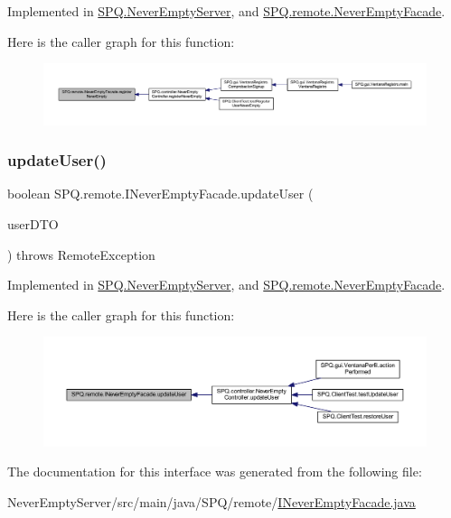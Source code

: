 Implemented in \mbox{\hyperlink{class_s_p_q_1_1_never_empty_server_ae52815c925e04018d6a1b2742d605063}{S\+P\+Q.\+Never\+Empty\+Server}}, and \mbox{\hyperlink{class_s_p_q_1_1remote_1_1_never_empty_facade_a52a0feff1dfb3347e55e46c3ac48fafc}{S\+P\+Q.\+remote.\+Never\+Empty\+Facade}}.

Here is the caller graph for this function\+:
\nopagebreak
\begin{figure}[H]
\begin{center}
\leavevmode
\includegraphics[width=350pt]{interface_s_p_q_1_1remote_1_1_i_never_empty_facade_a7867e1e698fea32a535a1daeda4e8d6a_icgraph}
\end{center}
\end{figure}
\mbox{\label{interface_s_p_q_1_1remote_1_1_i_never_empty_facade_add6dafb25f59c549e924c76c6e8f31c6}} 
\subsubsection{\texorpdfstring{update\+User()}{updateUser()}}
{\footnotesize\ttfamily boolean S\+P\+Q.\+remote.\+I\+Never\+Empty\+Facade.\+update\+User (\begin{DoxyParamCaption}\item[{\mbox{\hyperlink{class_s_p_q_1_1dto_1_1_user_d_t_o}{User\+D\+TO}}}]{user\+D\+TO }\end{DoxyParamCaption}) throws Remote\+Exception}



Implemented in \mbox{\hyperlink{class_s_p_q_1_1_never_empty_server_ad39f95ea2309841407f7e8b9e1b9f664}{S\+P\+Q.\+Never\+Empty\+Server}}, and \mbox{\hyperlink{class_s_p_q_1_1remote_1_1_never_empty_facade_a55ad685d3c176424a7f5f18e5ebe043b}{S\+P\+Q.\+remote.\+Never\+Empty\+Facade}}.

Here is the caller graph for this function\+:
\nopagebreak
\begin{figure}[H]
\begin{center}
\leavevmode
\includegraphics[width=350pt]{interface_s_p_q_1_1remote_1_1_i_never_empty_facade_add6dafb25f59c549e924c76c6e8f31c6_icgraph}
\end{center}
\end{figure}


The documentation for this interface was generated from the following file\+:\begin{DoxyCompactItemize}
\item 
Never\+Empty\+Server/src/main/java/\+S\+P\+Q/remote/\mbox{\hyperlink{_i_never_empty_facade_8java}{I\+Never\+Empty\+Facade.\+java}}\end{DoxyCompactItemize}
